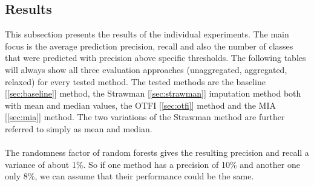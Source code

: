 \documentclass[11pt]{article}
\begin{document}
    \subsection{Results}
      This subsection presents the results of the individual experiments. The main focus is the average prediction precision, recall and also the number of classes that were predicted with precision above specific thresholds. The following tables will always show all three evaluation approaches (unaggregated, aggregated, relaxed) for every tested method. The tested methods are the baseline [\ref{sec:baseline}] method, the Strawman [\ref{sec:strawman}] imputation method both with mean and median values, the OTFI [\ref{sec:otfi}] method and the MIA [\ref{sec:mia}] method. The two variations of the Strawman method are further referred to simply as mean and median.
      \\~\\
      The randomness factor of random forests gives the resulting precision and recall a variance of about 1\%. So if one method has a precision of 10\% and another one only 8\%, we can assume that their performance could be the same.
\end{document}
